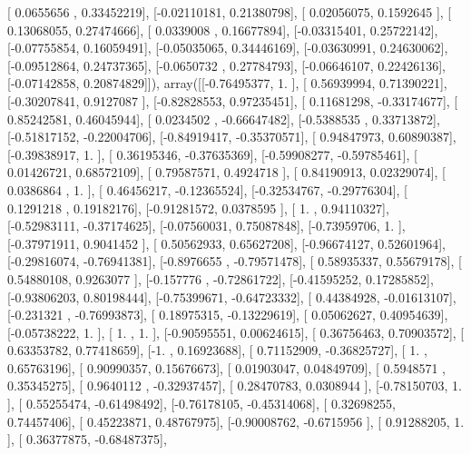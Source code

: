 \documentclass{article}
\begin{document}
       [ 0.0655656 ,  0.33452219],
       [-0.02110181,  0.21380798],
       [ 0.02056075,  0.1592645 ],
       [ 0.13068055,  0.27474666],
       [ 0.0339008 ,  0.16677894],
       [-0.03315401,  0.25722142],
       [-0.07755854,  0.16059491],
       [-0.05035065,  0.34446169],
       [-0.03630991,  0.24630062],
       [-0.09512864,  0.24737365],
       [-0.0650732 ,  0.27784793],
       [-0.06646107,  0.22426136],
       [-0.07142858,  0.20874829]]), array([[-0.76495377,  1.        ],
       [ 0.56939994,  0.71390221],
       [-0.30207841,  0.9127087 ],
       [-0.82828553,  0.97235451],
       [ 0.11681298, -0.33174677],
       [ 0.85242581,  0.46045944],
       [ 0.0234502 , -0.66647482],
       [-0.5388535 ,  0.33713872],
       [-0.51817152, -0.22004706],
       [-0.84919417, -0.35370571],
       [ 0.94847973,  0.60890387],
       [-0.39838917,  1.        ],
       [ 0.36195346, -0.37635369],
       [-0.59908277, -0.59785461],
       [ 0.01426721,  0.68572109],
       [ 0.79587571,  0.4924718 ],
       [ 0.84190913,  0.02329074],
       [ 0.0386864 ,  1.        ],
       [ 0.46456217, -0.12365524],
       [-0.32534767, -0.29776304],
       [ 0.1291218 ,  0.19182176],
       [-0.91281572,  0.0378595 ],
       [ 1.        ,  0.94110327],
       [-0.52983111, -0.37174625],
       [-0.07560031,  0.75087848],
       [-0.73959706,  1.        ],
       [-0.37971911,  0.9041452 ],
       [ 0.50562933,  0.65627208],
       [-0.96674127,  0.52601964],
       [-0.29816074, -0.76941381],
       [-0.8976655 , -0.79571478],
       [ 0.58935337,  0.55679178],
       [ 0.54880108,  0.9263077 ],
       [-0.157776  , -0.72861722],
       [-0.41595252,  0.17285852],
       [-0.93806203,  0.80198444],
       [-0.75399671, -0.64723332],
       [ 0.44384928, -0.01613107],
       [-0.231321  , -0.76993873],
       [ 0.18975315, -0.13229619],
       [ 0.05062627,  0.40954639],
       [-0.05738222,  1.        ],
       [ 1.        ,  1.        ],
       [-0.90595551,  0.00624615],
       [ 0.36756463,  0.70903572],
       [ 0.63353782,  0.77418659],
       [-1.        ,  0.16923688],
       [ 0.71152909, -0.36825727],
       [ 1.        ,  0.65763196],
       [ 0.90990357,  0.15676673],
       [ 0.01903047,  0.04849709],
       [ 0.5948571 ,  0.35345275],
       [ 0.9640112 , -0.32937457],
       [ 0.28470783,  0.0308944 ],
       [-0.78150703,  1.        ],
       [ 0.55255474, -0.61498492],
       [-0.76178105, -0.45314068],
       [ 0.32698255,  0.74457406],
       [ 0.45223871,  0.48767975],
       [-0.90008762, -0.6715956 ],
       [ 0.91288205,  1.        ],
       [ 0.36377875, -0.68487375],
\end{document}
